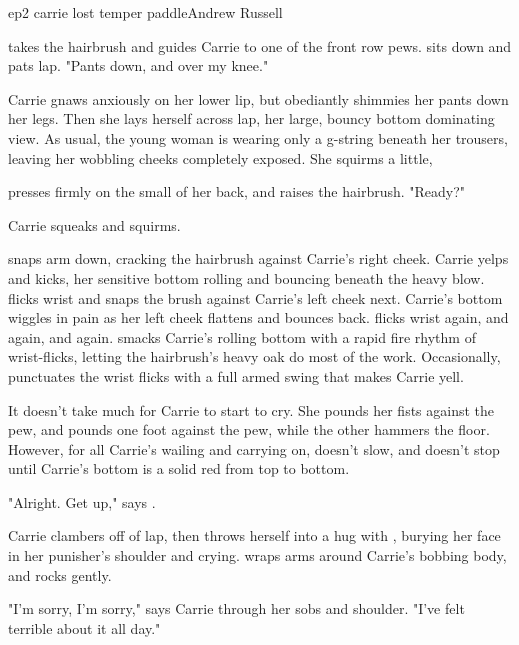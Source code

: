 \documentclass{book}
\begin{document}
\begin{childnode}{ep2 carrie lost temper paddle}{Andrew Russell}

    \name{} takes the hairbrush and guides Carrie to one of the front row pews. \HeShe{} sits down and pats \hisher{} lap. "Pants down, and over my knee."

    Carrie gnaws anxiously on her lower lip, but obediantly shimmies her pants down her legs. Then she lays herself across \names{} lap, her large, bouncy bottom dominating \names{} view.
    As usual, the young woman is wearing only a g-string beneath her trousers, leaving her wobbling cheeks completely exposed. She squirms a little,

    \name{} presses firmly on the small of her back, and raises the hairbrush. "Ready?"

    Carrie squeaks and squirms.

    \name{} snaps \hisher{} arm down, cracking the hairbrush against Carrie's right cheek. Carrie yelps and kicks, her sensitive bottom rolling and bouncing beneath the heavy blow. \name{}
    flicks \hisher{} wrist and snaps the brush against Carrie's left cheek next. Carrie's bottom wiggles in pain as her left cheek flattens and bounces back. \name{} flicks \hisher{} wrist again,
    and again, and again. \HeShe{} smacks Carrie's rolling bottom with a rapid fire rhythm of wrist-flicks, letting the hairbrush's heavy oak do most of the work. Occasionally, \heshe{} punctuates
    the wrist flicks with a full armed swing that makes Carrie yell.

    It doesn't take much for Carrie to start to cry. She pounds her fists against the pew, and pounds one foot against the pew, while the other hammers the floor. However, for all Carrie's wailing 
    and carrying on, \name{} doesn't slow, and \heshe{} doesn't stop until Carrie's bottom is a solid red from top to bottom.
    
    "Alright. Get up," says \name{}.

    Carrie clambers off of \names{} lap, then throws herself into a hug with \name{}, burying her face in her punisher's shoulder and crying. \name{} wraps \hisher{} arms around Carrie's bobbing
    body, and rocks gently.

    "I'm sorry, I'm sorry," says Carrie through her sobs and \names{} shoulder. "I've felt terrible about it all day."


\end{childnode}
\end{document}
